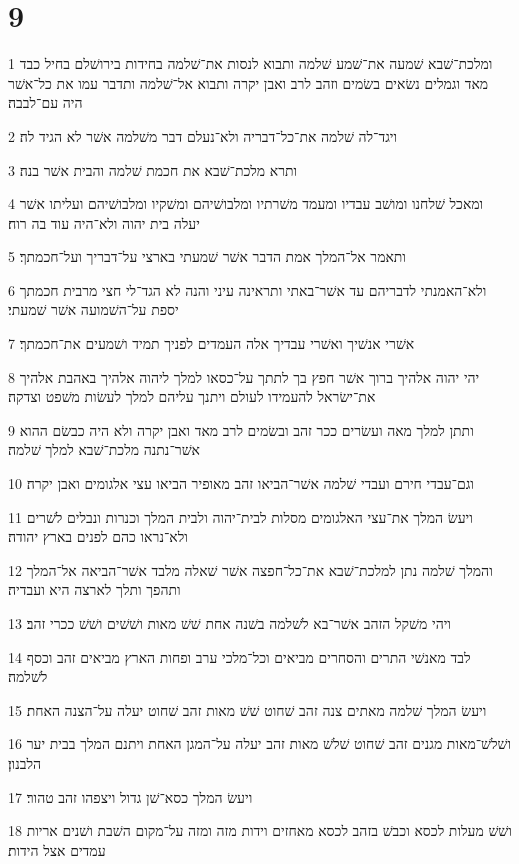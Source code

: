 \chapter{9}

\par 1 ומלכת־שׁבא שׁמעה את־שׁמע שׁלמה ותבוא לנסות את־שׁלמה בחידות בירושׁלם בחיל כבד מאד וגמלים נשׂאים בשׂמים וזהב לרב ואבן יקרה ותבוא אל־שׁלמה ותדבר עמו את כל־אשׁר היה עם־לבבה׃
\par 2 ויגד־לה שׁלמה את־כל־דבריה ולא־נעלם דבר משׁלמה אשׁר לא הגיד לה׃
\par 3 ותרא מלכת־שׁבא את חכמת שׁלמה והבית אשׁר בנה׃
\par 4 ומאכל שׁלחנו ומושׁב עבדיו ומעמד משׁרתיו ומלבושׁיהם ומשׁקיו ומלבושׁיהם ועליתו אשׁר יעלה בית יהוה ולא־היה עוד בה רוח׃
\par 5 ותאמר אל־המלך אמת הדבר אשׁר שׁמעתי בארצי על־דבריך ועל־חכמתך׃
\par 6 ולא־האמנתי לדבריהם עד אשׁר־באתי ותראינה עיני והנה לא הגד־לי חצי מרבית חכמתך יספת על־השׁמועה אשׁר שׁמעתי׃
\par 7 אשׁרי אנשׁיך ואשׁרי עבדיך אלה העמדים לפניך תמיד ושׁמעים את־חכמתך׃
\par 8 יהי יהוה אלהיך ברוך אשׁר חפץ בך לתתך על־כסאו למלך ליהוה אלהיך באהבת אלהיך את־ישׂראל להעמידו לעולם ויתנך עליהם למלך לעשׂות משׁפט וצדקה׃
\par 9 ותתן למלך מאה ועשׂרים ככר זהב ובשׂמים לרב מאד ואבן יקרה ולא היה כבשׂם ההוא אשׁר־נתנה מלכת־שׁבא למלך שׁלמה׃
\par 10 וגם־עבדי חירם ועבדי שׁלמה אשׁר־הביאו זהב מאופיר הביאו עצי אלגומים ואבן יקרה׃
\par 11 ויעשׂ המלך את־עצי האלגומים מסלות לבית־יהוה ולבית המלך וכנרות ונבלים לשׁרים ולא־נראו כהם לפנים בארץ יהודה׃
\par 12 והמלך שׁלמה נתן למלכת־שׁבא את־כל־חפצה אשׁר שׁאלה מלבד אשׁר־הביאה אל־המלך ותהפך ותלך לארצה היא ועבדיה׃
\par 13 ויהי משׁקל הזהב אשׁר־בא לשׁלמה בשׁנה אחת שׁשׁ מאות ושׁשׁים ושׁשׁ ככרי זהב׃
\par 14 לבד מאנשׁי התרים והסחרים מביאים וכל־מלכי ערב ופחות הארץ מביאים זהב וכסף לשׁלמה׃
\par 15 ויעשׂ המלך שׁלמה מאתים צנה זהב שׁחוט שׁשׁ מאות זהב שׁחוט יעלה על־הצנה האחת׃
\par 16 ושׁלשׁ־מאות מגנים זהב שׁחוט שׁלשׁ מאות זהב יעלה על־המגן האחת ויתנם המלך בבית יער הלבנון׃
\par 17 ויעשׂ המלך כסא־שׁן גדול ויצפהו זהב טהור׃
\par 18 ושׁשׁ מעלות לכסא וכבשׁ בזהב לכסא מאחזים וידות מזה ומזה על־מקום השׁבת ושׁנים אריות עמדים אצל הידות׃
